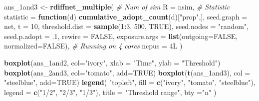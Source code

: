 \documentclass[]{book}
\newenvironment{Shaded}{\begin{snugshade}}{\end{snugshade}}
\newcommand{\CommentTok}[1]{\textcolor[rgb]{0.56,0.35,0.01}{\textit{#1}}}
\newcommand{\ControlFlowTok}[1]{\textcolor[rgb]{0.13,0.29,0.53}{\textbf{#1}}}
\newcommand{\DataTypeTok}[1]{\textcolor[rgb]{0.13,0.29,0.53}{#1}}
\newcommand{\DecValTok}[1]{\textcolor[rgb]{0.00,0.00,0.81}{#1}}
\newcommand{\FloatTok}[1]{\textcolor[rgb]{0.00,0.00,0.81}{#1}}
\newcommand{\KeywordTok}[1]{\textcolor[rgb]{0.13,0.29,0.53}{\textbf{#1}}}
\newcommand{\NormalTok}[1]{#1}
\newcommand{\OperatorTok}[1]{\textcolor[rgb]{0.81,0.36,0.00}{\textbf{#1}}}
\newcommand{\OtherTok}[1]{\textcolor[rgb]{0.56,0.35,0.01}{#1}}
\newcommand{\StringTok}[1]{\textcolor[rgb]{0.31,0.60,0.02}{#1}}
\begin{document}
\begin{Shaded}
\begin{Highlighting}[]
\NormalTok{ans_1and3 <-}\StringTok{ }\KeywordTok{rdiffnet_multiple}\NormalTok{(}
  \CommentTok{# Num of sim}
  \DataTypeTok{R              =}\NormalTok{ nsim,}
  \CommentTok{# Statistic}
  \DataTypeTok{statistic      =} \ControlFlowTok{function}\NormalTok{(d) }\KeywordTok{cumulative_adopt_count}\NormalTok{(d)[}\StringTok{"prop"}\NormalTok{,], }
  \DataTypeTok{seed.graph     =}\NormalTok{ net,}
  \DataTypeTok{t              =} \DecValTok{10}\NormalTok{,}
  \DataTypeTok{threshold.dist =} \KeywordTok{sample}\NormalTok{(}\DecValTok{1}\OperatorTok{:}\DecValTok{3}\NormalTok{, }\DecValTok{500}\NormalTok{, }\OtherTok{TRUE}\NormalTok{),}
  \DataTypeTok{seed.nodes     =} \StringTok{"random"}\NormalTok{,}
  \DataTypeTok{seed.p.adopt   =} \FloatTok{.1}\NormalTok{,}
  \DataTypeTok{rewire         =} \OtherTok{FALSE}\NormalTok{,}
  \DataTypeTok{exposure.args  =} \KeywordTok{list}\NormalTok{(}\DataTypeTok{outgoing=}\OtherTok{FALSE}\NormalTok{, }\DataTypeTok{normalized=}\OtherTok{FALSE}\NormalTok{),}
  \CommentTok{# Running on 4 cores}
  \DataTypeTok{ncpus          =}\NormalTok{ 4L}
\NormalTok{  )}
\end{Highlighting}
\end{Shaded}

\begin{Shaded}
\begin{Highlighting}[]
\KeywordTok{boxplot}\NormalTok{(ans_1and2, }\DataTypeTok{col=}\StringTok{"ivory"}\NormalTok{, }\DataTypeTok{xlab =} \StringTok{"Time"}\NormalTok{, }\DataTypeTok{ylab =} \StringTok{"Threshold"}\NormalTok{)}
\KeywordTok{boxplot}\NormalTok{(ans_2and3, }\DataTypeTok{col=}\StringTok{"tomato"}\NormalTok{, }\DataTypeTok{add=}\OtherTok{TRUE}\NormalTok{)}
\KeywordTok{boxplot}\NormalTok{(}\KeywordTok{t}\NormalTok{(ans_1and3), }\DataTypeTok{col =} \StringTok{"steelblue"}\NormalTok{, }\DataTypeTok{add=}\OtherTok{TRUE}\NormalTok{)}
\KeywordTok{legend}\NormalTok{(}
  \StringTok{"topleft"}\NormalTok{,}
  \DataTypeTok{fill =} \KeywordTok{c}\NormalTok{(}\StringTok{"ivory"}\NormalTok{, }\StringTok{"tomato"}\NormalTok{, }\StringTok{"steelblue"}\NormalTok{),}
  \DataTypeTok{legend =} \KeywordTok{c}\NormalTok{(}\StringTok{"1/2"}\NormalTok{, }\StringTok{"2/3"}\NormalTok{, }\StringTok{"1/3"}\NormalTok{),}
  \DataTypeTok{title =} \StringTok{"Threshold range"}\NormalTok{,}
  \DataTypeTok{bty =}\StringTok{"n"}
\NormalTok{)}
\end{Highlighting}
\end{Shaded}
\end{document}
